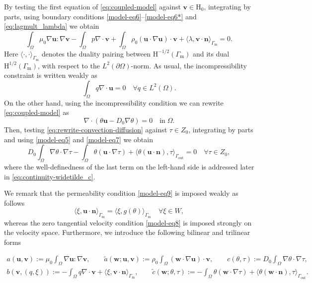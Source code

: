\documentclass[onefignum,onetabnum,reqno,a4paper,final]{siamart250211}
\def\O{\Omega}
\newcommand\bu{\boldsymbol{u}}
\newcommand\bv{\boldsymbol{v}}
\newcommand\bn{\boldsymbol{n}}
\newcommand\bw{\boldsymbol{w}}
\newcommand\0{\mathbf{0}}
\renewcommand\H{\mathrm{H}}
\newcommand\bH{\boldsymbol{\mathrm{H}}}
\renewcommand\O{\Omega}
\newcommand\Gm{\Gamma_{\mathrm{m}}}
\newcommand\Go{\Gamma_{\mathrm{out}}}
\numberwithin{figure}{section}
\numberwithin{table}{section}
\begin{document}
By testing the first equation of \eqref{eq:coupled-model} against $\bv\in \bH_0$, integrating by parts, using  boundary conditions \eqref{model-eq6}--\eqref{model-eq6*} and \eqref{eq:lagmult_lambda} we obtain
\begin{equation}\label{pairing-1}
	\int_\Omega\mu_0\nabla\bu:\nabla \bv-\int_\Omega p  \nabla\cdot\bv+\int_\Omega \rho_0\left(\bu\cdot\nabla \bu\right)\cdot\bv + \langle\lambda,\bv\cdot\bn\rangle_{\Gm}=0.
\end{equation}
Here $\langle\cdot,\cdot\rangle_{\Gm}$ denotes the duality pairing between $\H^{-1/2}(\Gm)$ and its dual $\H^{1/2}(\Gm)$, with respect to the $L^2(\partial\Omega)$-norm. 
%
As usual, the incompressibility constraint is written weakly as 
\begin{equation*}
	\int_\Omega q \nabla \cdot \bu = 0 \quad \forall q\in L^2(\Omega).
\end{equation*}
%
On the other hand, using the incompressibility condition we can rewrite  \eqref{eq:coupled-model} as
\begin{equation}
	\label{eq:rewrite-convection-diffusion}
	\nabla\cdot\left(\theta\bu - D_0\nabla\theta\right)=0\quad \text{in}\;\O.
\end{equation}
Then, testing \eqref{eq:rewrite-convection-diffusion} against $\tau\in Z_0$, integrating by parts and using  \eqref{model-eq5} and \eqref{model-eq7} we obtain
\[
D_0\int_\O\nabla\theta\cdot\nabla\tau - \int_\O \theta (\bu\cdot\nabla\tau) + \langle \theta(\bu\cdot\bn),\tau\rangle_{\Go} =0 \quad \forall \tau \in Z_0,
\]
where the well-definedness of the last term on the left-hand side is addressed later in \eqref{eq:continuity-widetilde_c}.  

We remark that the permeability condition \eqref{model-eq9} is imposed weakly as follows
\begin{equation}\label{pairing-2}
	\langle\xi,\bu\cdot\bn\rangle_{\Gm} = \langle  \xi, g(\theta)\rangle_{\Gm}\quad\forall \xi\in W,
\end{equation}
whereas the zero tangential velocity condition \eqref{model-eq8} is imposed strongly on the velocity space. Furthermore, we introduce the following bilinear and trilinear forms
\begin{linenomath}
	\begin{gather*}
		a(\bu,\bv):=\mu_0\int_\Omega \nabla\bu:\nabla\bv,\qquad 
		\widetilde{a}(\bw;\bu,\bv):=\rho_0\int_\Omega (\bw\cdot\nabla\bu)\cdot\bv,\qquad c(\theta,\tau):=D_0\int_\Omega \nabla \theta\cdot\nabla\tau, \\
		b(\bv,(q,\xi)):=-\int_\Omega q \nabla\cdot\bv+\langle\xi,\bv\cdot\bn\rangle_{\Gm}, 
		\qquad 
		\widetilde{c}(\bw;\theta,\tau):=-\int_\Omega \theta(\bw\cdot\nabla \tau)+\langle\theta(\bw\cdot \bn),\tau\rangle_{\Go}.\nonumber
	\end{gather*}
\end{linenomath}
\end{document}
